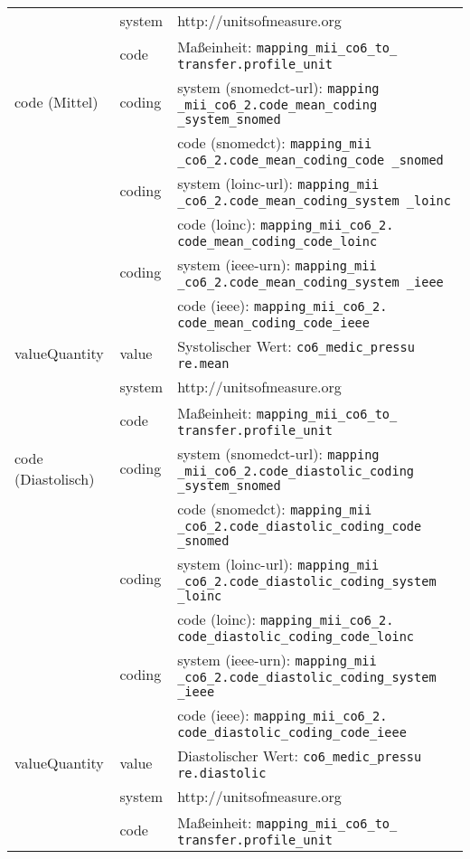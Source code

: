 \begin{longtable}{|l|l|p{7cm}|}
	\cline{2-3}
	& system & http://unitsofmeasure.org \\ 
	\cline{2-3}
	& code & Maßeinheit: \texttt{mapping\_mii\_co6\_to\_ transfer.profile\_unit} \\ \hline
	code (Mittel) & coding & system (\ac{snomedct}-\acs{url}): \texttt{mapping \_mii\_co6\_2.code\_mean\_coding \_system\_snomed} \\ 
	\cline{3-3} 
	&  & code (\ac{snomedct}): \texttt{mapping\_mii \_co6\_2.code\_mean\_coding\_code \_snomed} \\
	\cline{2-3} 
	& coding & system (\ac{loinc}-\ac{url}): \texttt{mapping\_mii \_co6\_2.code\_mean\_coding\_system \_loinc} \\ 
	\cline{3-3} 
	&  & code (\ac{loinc}): \texttt{mapping\_mii\_co6\_2. code\_mean\_coding\_code\_loinc} \\ 
	\cline{2-3} 
	&  coding & system (\ac{ieee}-\acs{urn}): \texttt{mapping\_mii \_co6\_2.code\_mean\_coding\_system \_ieee} \\ 
	\cline{3-3} 
	&  & code (\ac{ieee}): \texttt{mapping\_mii\_co6\_2. code\_mean\_coding\_code\_ieee} \\ \hline
	valueQuantity & value & Systolischer Wert: \texttt{co6\_medic\_pressu re.mean} \\
	\cline{2-3}
	& system & http://unitsofmeasure.org \\ 
	\cline{2-3}
	& code & Maßeinheit: \texttt{mapping\_mii\_co6\_to\_ transfer.profile\_unit} \\ \hline
	code (Diastolisch) & coding & system (\ac{snomedct}-\acs{url}): \texttt{mapping \_mii\_co6\_2.code\_diastolic\_coding \_system\_snomed} \\ 
	\cline{3-3} 
	&  & code (\ac{snomedct}): \texttt{mapping\_mii \_co6\_2.code\_diastolic\_coding\_code \_snomed} \\
	\cline{2-3} 
	&  coding & system (\ac{loinc}-\ac{url}): \texttt{mapping\_mii \_co6\_2.code\_diastolic\_coding\_system \_loinc} \\ 
	\cline{3-3} 
	&  & code (\ac{loinc}): \texttt{mapping\_mii\_co6\_2. code\_diastolic\_coding\_code\_loinc} \\ 
	\cline{2-3} 
	&  coding & system (\ac{ieee}-\acs{urn}): \texttt{mapping\_mii \_co6\_2.code\_diastolic\_coding\_system \_ieee} \\ 
	\cline{3-3} 
	&  & code (\ac{ieee}): \texttt{mapping\_mii\_co6\_2. code\_diastolic\_coding\_code\_ieee} \\ \hline
	valueQuantity & value & Diastolischer Wert: \texttt{co6\_medic\_pressu re.diastolic} \\
	\cline{2-3}
	& system & http://unitsofmeasure.org \\ 
	\cline{2-3}
	& code & Maßeinheit: \texttt{mapping\_mii\_co6\_to\_ transfer.profile\_unit} \\ \hline
\end{longtable}

